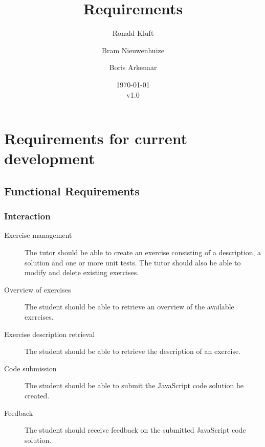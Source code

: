 \documentclass{article}
\begin{document}
\title{Requirements}
\author{Ronald Kluft \and Bram Nieuwenhuize \and Boris Arkenaar}
\date{\today\\v1.0}
\maketitle

\section{Requirements for current development}
\subsection{Functional Requirements}
\subsubsection{Interaction}
\begin{description}
  \item[Exercise management] The tutor should be able to create an exercise
    consisting of a description, a solution and one or more unit tests. The
    tutor should also be able to modify and delete existing exercises.
  \item[Overview of exercises] The student should be able to retrieve an
    overview of the available exercises.
  \item[Exercise description retrieval] The student should be able to retrieve
    the description of an exercise.
  \item[Code submission] The student should be able to submit the JavaScript 
    code solution he created.
  \item[Feedback] The student should receive feedback on the submitted 
    JavaScript code solution. 
\end{description}
\end{document}
